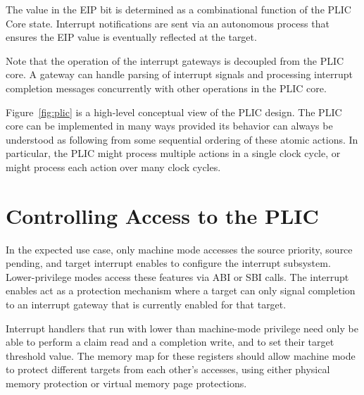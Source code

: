 The value in the EIP bit is determined as a combinational function of
the PLIC Core state.  Interrupt notifications are sent via an
autonomous process that ensures the EIP value is eventually reflected
at the target. 

Note that the operation of the interrupt gateways is decoupled from
the PLIC core.  A gateway can handle parsing of interrupt signals and
processing interrupt completion messages concurrently with other
operations in the PLIC core.

\begin{commentary}
Figure~\ref{fig:plic} is a high-level conceptual view of the PLIC
design.  The PLIC core can be implemented in many ways provided its
behavior can always be understood as following from some sequential
ordering of these atomic actions.  In particular, the PLIC might
process multiple actions in a single clock cycle, or might process
each action over many clock cycles.
\end{commentary}

\section{Controlling Access to the PLIC}

In the expected use case, only machine mode accesses the source
priority, source pending, and target interrupt enables to configure
the interrupt subsystem.  Lower-privilege modes access these features
via ABI or SBI calls. The interrupt enables act as a protection
mechanism where a target can only signal completion to an interrupt
gateway that is currently enabled for that target.

Interrupt handlers that run with lower than machine-mode privilege
need only be able to perform a claim read and a completion write, and
to set their target threshold value.  The memory map for these
registers should allow machine mode to protect different targets from
each other's accesses, using either physical memory protection or
virtual memory page protections.

